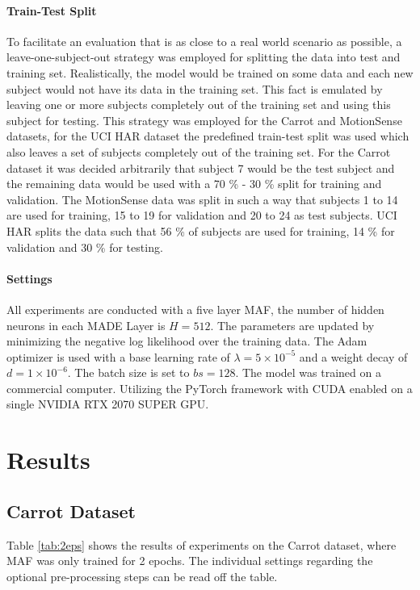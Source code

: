 \documentclass[11pt,titlepage,oneside,openany]{book}
\begin{document}
\paragraph{Train-Test Split}
To facilitate an evaluation that is as close to a real world scenario as possible, a leave-one-subject-out strategy was employed for splitting the data into test and training set. Realistically, the model would be trained on some data and each new subject would not have its data in the training set. This fact is emulated by leaving one or more subjects completely out of the training set and using this subject for testing. This strategy was employed for the Carrot and MotionSense datasets, for the UCI HAR dataset the predefined train-test split was used which also leaves a set of subjects completely out of the training set. For the Carrot dataset it was decided arbitrarily that subject 7 would be the test subject and the remaining data would be used with a 70 \% - 30 \% split for training and validation.  The MotionSense data was split in such a way that subjects 1 to 14 are used for training, 15 to 19 for validation and  20 to 24 as test subjects. UCI HAR splits the data such that 56 \% of subjects are used for training, 14 \% for validation and 30 \% for testing.

\paragraph{Settings}
All experiments are conducted with a five layer MAF, the number of hidden neurons in each MADE Layer is $H=512$. The parameters are updated by minimizing the negative log likelihood over the training data. The Adam optimizer is used with a base learning rate of $\lambda = 5 \times 10^{-5}$ and a weight decay of $d = 1 \times 10^{-6}$. The batch size is set to $bs = 128$. The model was trained on a commercial computer. Utilizing the PyTorch framework with CUDA enabled on a single NVIDIA RTX 2070 SUPER GPU.


\section{Results}
\label{sec:results}

\subsection{Carrot Dataset}
Table \ref{tab:2eps} shows the results of experiments on the Carrot dataset, where MAF was only trained for 2 epochs. The individual settings regarding the optional pre-processing steps can be read off the table.
\end{document}
